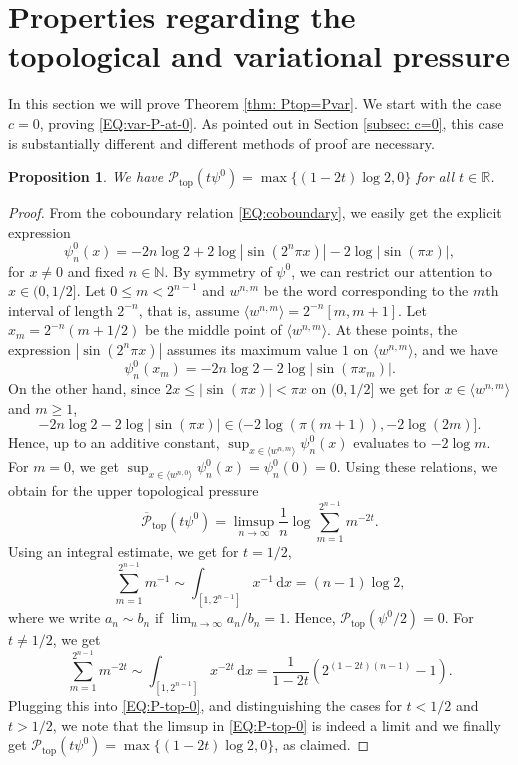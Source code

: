 \documentclass[11pt,reqno]{amsart}
\theoremstyle{plain}
\newtheorem{prop}[theorem]{Proposition}
\theoremstyle{definition}
\newcommand{\R}{{\mathbb R}}
\newcommand{\N}{{\mathbb N}}
\newcommand{\mc}{\mathcal}
\newcommand{\dd}{\,\mathrm{d}}
\begin{document}
\section{Properties regarding the topological and variational pressure}\label{sec: pressure}

In this section we will prove Theorem \ref{thm: Ptop=Pvar}. We start with the case $c=0$, proving \eqref{EQ:var-P-at-0}. As pointed out in Section \ref{subsec: c=0}, this case is substantially different and different methods of proof are necessary. 


\begin{prop}
\label{PROP:top-P-at-0}
We have $\mc P_{\operatorname{top}} (t \psi^0) = \max\{ (1-2t)\log 2, 0 \}$ for all $t \in \R$.
\end{prop}

\begin{proof}
From the coboundary relation \eqref{EQ:coboundary}, we easily get the explicit expression
\[
\psi^0_n(x) = - 2n \log 2 + 2 \log |\sin(2^n \pi x)| - 2 \log|\sin(\pi x)|,
\]
for $x \neq 0$ and fixed $n \in \N$. By symmetry of $\psi^0$, we can restrict our attention to $x \in (0,1/2]$. 
Let $0 \leqslant m < 2^{n-1}$ and $w^{n,m}$ be the word corresponding to the $m$th interval of length $2^{-n}$, that is, assume $\langle w^{n,m} \rangle = 2^{-n}[m, m+ 1]$. Let $x_m = 2^{-n}(m + 1/2)$ be the middle point of $\langle w^{n,m} \rangle$. 
At these points, the expression $|\sin(2^n \pi x)|$ assumes its maximum value $1$ on $\langle w^{n,m} \rangle$, and we have
\[
\psi_n^0(x_m) = - 2 n \log 2 - 2 \log |\sin(\pi x_m)|.
\]
On the other hand, since $2x \leqslant | \sin(\pi x ) | < \pi x$ on $(0,1/2]$ we get for $x \in \langle w^{n,m} \rangle$ and $m\geqslant 1$,
\[
 -2 n \log 2 - 2 \log |\sin(\pi x)| \in (-2 \log(\pi(m+1)), - 2 \log  (2m)].  
\]
Hence, up to an additive constant, $\sup_{x \in \langle w^{n,m} \rangle} \psi^0_n(x)$ evaluates to $- 2 \log m$. For $m =0$, we get $\sup_{x \in \langle w^{n, 0} \rangle} \psi_n^0(x) = \psi_n^0(0) = 0$.  Using these relations, we obtain for the upper topological pressure
\begin{equation}
\label{EQ:P-top-0}
\overline{\mc P}_{\operatorname{top}}(t \psi^0) = \limsup_{n \to \infty} \frac{1}{n} \log \sum_{m=1}^{2^{n-1}} m^{-2t}.
\end{equation}
Using an integral estimate, we get for $t = 1/2$,
\[
\sum_{m=1}^{2^{n-1}} m^{-1} \sim \int_{[1,2^{n-1}]}x^{-1} \dd x = (n-1) \log 2,
\]
where we write $a_n\sim b_n$ if $\lim_{n\to\infty} a_n/b_n=1$. 
Hence, $\mc P_{\operatorname{top}}( \psi^0/2) = 0$. For $t \neq 1/2$, we get
\[
\sum_{m = 1}^{2^{n-1}} m^{-2t} \sim \int_{[1,2^{n-1}]} x^{-2t} \dd x = \frac{1}{1-2t} \left( 2^{(1-2t)(n-1)} - 1\right).
\]
Plugging this into \eqref{EQ:P-top-0}, and distinguishing the cases for $t<1/2$ and $t>1/2$, we note that the limsup in \eqref{EQ:P-top-0} is indeed a limit and we finally get $\mc P_{\operatorname{top}}(t \psi^0) = \max \{ (1-2t)\log 2,0 \}$, as claimed.
\end{proof}
\end{document}
